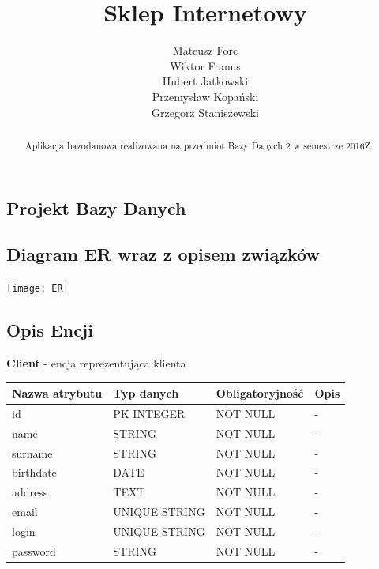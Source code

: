 \documentclass[10pt,a4paper]{article}
\author{
  \small Mateusz Forc\\
  \small Wiktor Franus\\
  \small Hubert Jatkowski\\
  \small Przemysław Kopański\\
  \small Grzegorz Staniszewski\\
}
\title{Sklep Internetowy}
\begin{document}
  \maketitle
  \begin{abstract}
    \begin{center}
    Aplikacja bazodanowa realizowana na przedmiot Bazy Danych 2 w semestrze 2016Z.
    \end{center}
  \end{abstract}
  \tableofcontents
  \newpage
  \begin{landscape}
  \pagestyle{empty}
  \section{Projekt Bazy Danych}
  
    \subsection{Diagram ER wraz z opisem związków}
      \begin{center}
        \texttt{[image: ER]}
      \end{center}
   \end{landscape}
          \newpage 
    \subsection{Opis Encji}
     \textbf{Client} - encja reprezentująca klienta
      \begin{center}
        \begin{tabular}{| m{3cm} | m{3cm} | m{3cm} | m{3cm} |}
          \hline
          Nazwa atrybutu & Typ danych & Obligatoryjność & Opis\\ \hline
		  id        & PK INTEGER    & NOT NULL 		    & -\\ \hline
		  name      & STRING        & NOT NULL 			& -\\ \hline
		  surname   & STRING        & NOT NULL 			& -\\ \hline
		  birthdate & DATE          & NOT NULL 			& -\\ \hline
		  address   & TEXT          & NOT NULL 			& -\\ \hline
		  email     & UNIQUE STRING & NOT NULL 			& -\\ \hline
		  login     & UNIQUE STRING & NOT NULL 			& -\\ \hline
		  password  & STRING        & NOT NULL 			& -\\ \hline
		\end{tabular}
	  \end{center}
\end{document}
